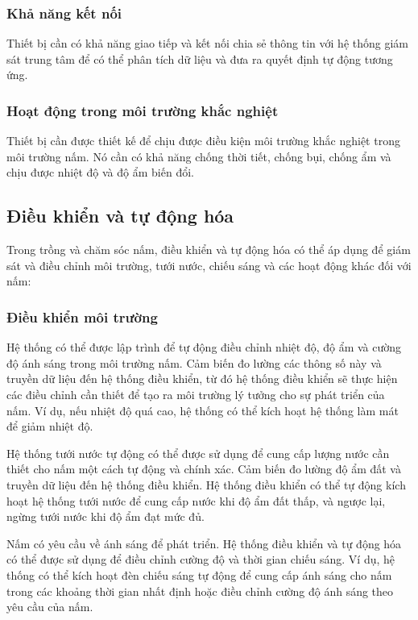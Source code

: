 \subsubsection{Khả năng kết nối}
Thiết bị cần có khả năng giao tiếp và kết nối chia sẻ thông tin với hệ thống giám sát trung tâm để có thể phân tích dữ liệu và đưa ra quyết định tự động tương ứng.
\subsubsection{Hoạt động trong môi trường khắc nghiệt}
Thiết bị cần được thiết kế để chịu được điều kiện môi trường khắc nghiệt trong môi trường nấm. Nó cần có khả năng chống thời tiết, chống bụi, chống ẩm và chịu được nhiệt độ và độ ẩm biến đổi.

\subsection{Điều khiển và tự động hóa}
Trong trồng và chăm sóc nấm, điều khiển và tự động hóa có thể áp dụng để giám sát và điều chỉnh môi trường, tưới nước, chiếu sáng và các hoạt động khác đối với nấm:

\subsubsection{Điều khiển môi trường}

Hệ thống có thể được lập trình để tự động điều chỉnh nhiệt độ, độ ẩm và cường độ ánh sáng trong môi trường nấm. Cảm biến đo lường các thông số này và truyền dữ liệu đến hệ thống điều khiển, từ đó hệ thống điều khiển sẽ thực hiện các điều chỉnh cần thiết để tạo ra môi trường lý tưởng cho sự phát triển của nấm. Ví dụ, nếu nhiệt độ quá cao, hệ thống có thể kích hoạt hệ thống làm mát để giảm nhiệt độ.

Hệ thống tưới nước tự động có thể được sử dụng để cung cấp lượng nước cần thiết cho nấm một cách tự động và chính xác. Cảm biến đo lường độ ẩm đất và truyền dữ liệu đến hệ thống điều khiển. Hệ thống điều khiển có thể tự động kích hoạt hệ thống tưới nước để cung cấp nước khi độ ẩm đất thấp, và ngược lại, ngừng tưới nước khi độ ẩm đạt mức đủ.

Nấm có yêu cầu về ánh sáng để phát triển. Hệ thống điều khiển và tự động hóa có thể được sử dụng để điều chỉnh cường độ và thời gian chiếu sáng. Ví dụ, hệ thống có thể kích hoạt đèn chiếu sáng tự động để cung cấp ánh sáng cho nấm trong các khoảng thời gian nhất định hoặc điều chỉnh cường độ ánh sáng theo yêu cầu của nấm.


